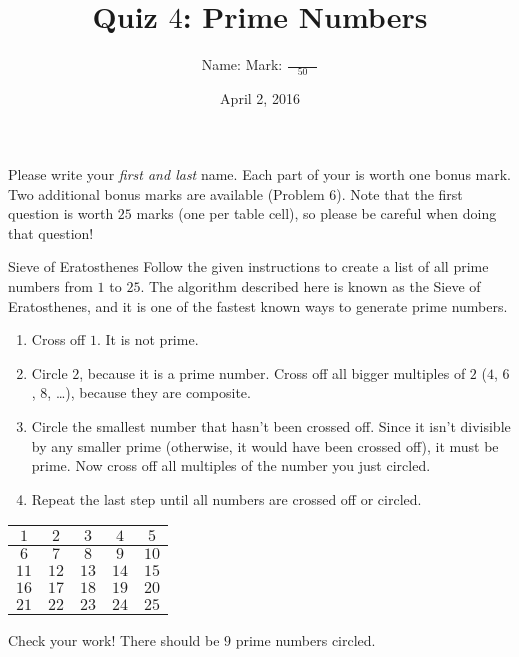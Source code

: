 \documentclass[12pt,letterpaper]{article}
\title{Quiz $4$: Prime Numbers}
\author{Name: \underline{\hspace{5cm}} Mark: $\displaystyle \frac{\hspace{3em}}{50}$}
\date{April 2, 2016}
\begin{document}
\maketitle

Please write your \emph{first and last} name. Each part of your is worth one
bonus mark. Two additional bonus marks are available (Problem 6). Note that the
first question is worth $25$ marks (one per table cell), so please be careful
when doing that question!

\thispagestyle{empty}

\begin{problem}{Sieve of Eratosthenes}
 Follow the given instructions to create a list of all prime numbers from $1$
 to $25$. The algorithm described here is known as the Sieve of Eratosthenes,
 and it is one of the fastest known ways to generate prime numbers.

 \begin{enumerate}
  \item Cross off $1$. It is not prime.
  \item Circle $2$, because it is a prime number. Cross off all bigger multiples
  of $2$ ($4$, $6$, $8$, \dots), because they are composite.
  \item Circle the smallest number that hasn't been crossed off. Since it isn't
  divisible by any smaller prime (otherwise, it would have been crossed off),
  it must be prime. Now cross off all multiples of the number you just circled.
  \item Repeat the last step until all numbers are crossed off or circled.
 \end{enumerate}

 \begin{center}
  \def\arraystretch{1.7}
  \begin{tabular}{|c|c|c|c|c|}
   \hline
   $1$ & $2$ & $3$ & $4$ & $5$ \\
   \hline
   $6$ & $7$ & $8$ & $9$ & $10$ \\
   \hline
   $11$ & $12$ & $13$ & $14$ & $15$ \\
   \hline
   $16$ & $17$ & $18$ & $19$ & $20$ \\
   \hline
   $21$ & $22$ & $23$ & $24$ & $25$ \\
   \hline
  \end{tabular}
 \end{center}

 Check your work! There should be $9$ prime numbers circled.
\end{problem}
\end{document}
